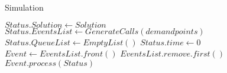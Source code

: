 \begin{algorithm}
  \hline \vspace{3pt}
  \caption{Simulation}\label{alg_sim}
  \vspace{3pt} \hline
  \begin{algorithmic}[0]
    \State $Status.Solution \gets Solution$
    \State $Status.EventsList \gets GenerateCalls(demandpoints)$
    \State $Status.QueueList \gets EmptyList()$
    \State $Status.time \gets 0$
    \State $Event \gets EventsList.front()$
    \State $EventsList.remove.first()$
    \State $Event.process(Status)$
    \EndWhile
    \EndProcedure
  \end{algorithmic}
  \hline
\end{algorithm}
